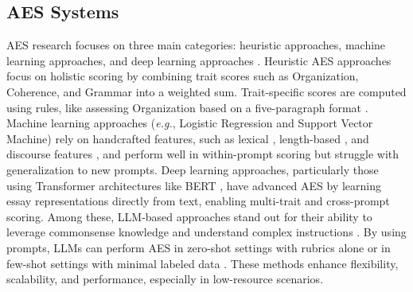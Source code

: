 \subsection{AES Systems}
AES research focuses on three main categories: heuristic approaches, machine learning approaches, and deep learning approaches \cite{li2024reflection}. Heuristic AES approaches focus on holistic scoring by combining trait scores such as Organization, Coherence, and Grammar into a weighted sum. Trait-specific scores are computed using rules, like assessing Organization based on a five-paragraph format \cite{Attali2006erator}. Machine learning approaches (\textit{e.g.}, Logistic Regression and Support Vector Machine) rely on handcrafted features, such as lexical \cite{chen2013lexical}, length-based \cite{Sowmya2016linguistic,yannakoudakis2012lenthbased}, and discourse features \cite{yannakoudakis2012lenthbased}, and perform well in within-prompt scoring but struggle with generalization to new prompts. Deep learning approaches, particularly those using Transformer architectures like BERT \cite{wang2022bert}, have advanced AES by learning essay representations directly from text, enabling multi-trait and cross-prompt scoring. Among these, LLM-based approaches stand out for their ability to leverage commonsense knowledge and understand complex instructions \cite{MIZUMOTO2023llmbased}. By using prompts, LLMs can perform AES in zero-shot settings with rubrics alone \cite{lee2024TOEFL11} or in few-shot settings with minimal labeled data \cite{mansour2024fewshoting,xiao2024fewshoting}. These methods enhance flexibility, scalability, and performance, especially in low-resource scenarios.


